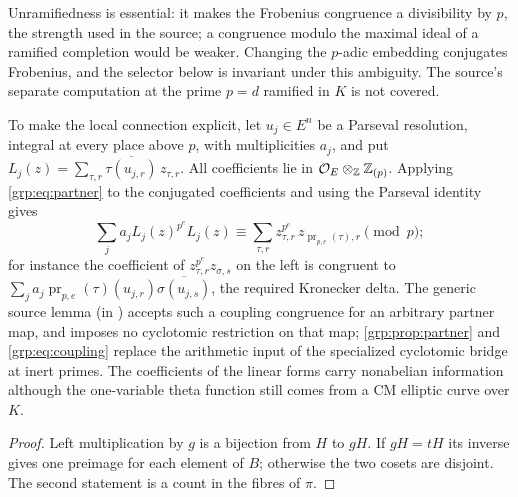 Unramifiedness is essential: it makes the Frobenius congruence a divisibility
by $p$, the strength used in the source; a congruence modulo the maximal ideal
of a ramified completion would be weaker. Changing the $p$-adic embedding
conjugates Frobenius, and the selector below is invariant under this
ambiguity. The source's separate computation at the prime $p=d$ ramified in
$K$ is not covered.

To make the local connection explicit, let $u_j\in E^n$ be a Parseval
resolution, integral at every place above $p$, with multiplicities $a_j$, and
put $L_j(z)=\sum_{\tau,r}\overline{\tau(u_{j,r})}\,z_{\tau,r}$. All
coefficients lie in $\mathcal{O}_E\otimes_{\mathbb{Z}}\mathbb{Z}_{(p)}$. Applying \eqref{grp:eq:partner}
to the conjugated coefficients and using the Parseval identity gives
\begin{equation}\label{grp:eq:coupling}
 \sum_ja_jL_j(z)^{p^e}L_j(z)\equiv
 \sum_{\tau,r}z_{\tau,r}^{p^e}\,z_{\operatorname{pr}_{p,e}(\tau),r}\pmod p ;
\end{equation}
for instance the coefficient of $z_{\tau,r}^{p^e}z_{\sigma,s}$ on the left is
congruent to
$\sum_ja_j\operatorname{pr}_{p,e}(\tau)(u_{j,r})\overline{\sigma(u_{j,s})}$,
the required Kronecker delta. The generic source lemma
 (in
) accepts such a coupling
congruence for an arbitrary partner map, and  imposes no
cyclotomic restriction on that map; \cref{grp:prop:partner} and
\eqref{grp:eq:coupling} replace the arithmetic input of the specialized
cyclotomic bridge at inert primes. The coefficients of the linear forms carry
nonabelian information although the one-variable theta function still comes
from a CM elliptic curve over $K$.


\begin{proof}
Left multiplication by $g$ is a bijection from $H$ to $gH$. If $gH=tH$ its
inverse gives one preimage for each element of $B$; otherwise the two cosets
are disjoint. The second statement is a count in the fibres of $\pi$.
\end{proof}

